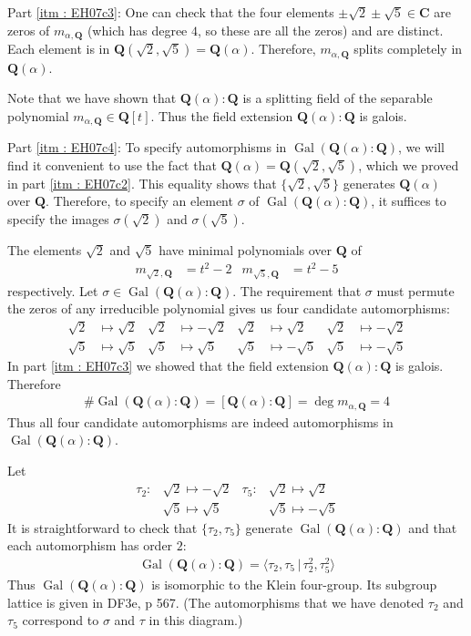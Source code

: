 \documentclass[oneside, english, 11pt]{article}
\newcommand{\fontField}[1]{\mathbf{#1}}
\newcommand{\C}{\complexes}
\newcommand{\complexes}{\fontField{C}}
\newcommand{\Gal}{\galoisGroup}
\DeclareMathOperator{\galoisGroup}{Gal}
\newcommand{\order}{\#}
\newcommand{\Q}{\rationals}
\newcommand{\rationals}{\fontField{Q}}
\newcommand{\st}{{\, | \,}}
\begin{document}
Part \ref{itm : EH07c3}: One can check that the four elements $\pm{}\sqrt{2} \pm{} \sqrt{5} \in \C$ are zeros of $m_{\alpha, \Q}$ (which has degree $4$, so these are all the zeros) and are distinct. Each element is in $\Q(\sqrt{2}, \sqrt{5}) = \Q(\alpha)$. Therefore, $m_{\alpha, \Q}$ splits completely in $\Q(\alpha)$.

Note that we have shown that $\Q(\alpha) : \Q$ is a splitting field of the separable polynomial $m_{\alpha, \Q} \in \Q[t]$. Thus the field extension $\Q(\alpha) : \Q$ is galois.

Part \ref{itm : EH07c4}: To specify automorphisms in $\Gal(\Q(\alpha) : \Q)$, we will find it convenient to use the fact that $\Q(\alpha) = \Q(\sqrt{2}, \sqrt{5})$, which we proved in part \ref{itm : EH07c2}. This equality shows that $\{\sqrt{2}, \sqrt{5}\}$ generates $\Q(\alpha)$ over $\Q$. Therefore, to specify an element $\sigma$ of $\Gal(\Q(\alpha) : \Q)$, it suffices to specify the images $\sigma(\sqrt{2})$ and $\sigma(\sqrt{5})$.

The elements $\sqrt{2}$ and $\sqrt{5}$ have minimal polynomials over $\Q$ of
\begin{align*}
m_{\sqrt{2}, \Q}
&=
t^{2} - 2
&
m_{\sqrt{5}, \Q}
&=
t^{2} - 5
\end{align*}
respectively. Let $\sigma \in \Gal(\Q(\alpha) : \Q)$. The requirement that $\sigma$ must permute the zeros of any irreducible polynomial gives us four candidate automorphisms:
\begin{align*}
\sqrt{2}
&\mapsto
\sqrt{2}
&
\sqrt{2}
&\mapsto
-\sqrt{2}
&
\sqrt{2}
&\mapsto
\sqrt{2}
&
\sqrt{2}
&\mapsto
-\sqrt{2}
\\
\sqrt{5}
&\mapsto
\sqrt{5}
&
\sqrt{5}
&\mapsto
\sqrt{5}
&
\sqrt{5}
&\mapsto
-\sqrt{5}
&
\sqrt{5}
&\mapsto
-\sqrt{5}
\end{align*}
In part \ref{itm : EH07c3} we showed that the field extension $\Q(\alpha) : \Q$ is galois. Therefore
\begin{align*}
\order \Gal(\Q(\alpha) : \Q)
=
[\Q(\alpha) : \Q]
=
\deg m_{\alpha, \Q}
=
4
\end{align*}
Thus all four candidate automorphisms are indeed automorphisms in $\Gal(\Q(\alpha) : \Q)$.

Let
\begin{align*}
\tau_{2}
:
{}&\sqrt{2}
\mapsto
-\sqrt{2}
&
\tau_{5}
:
{}&\sqrt{2}
\mapsto
\sqrt{2}
\\
&\sqrt{5}
\mapsto
\sqrt{5}
&
&\sqrt{5}
\mapsto
-\sqrt{5}
\end{align*}
It is straightforward to check that $\{\tau_{2}, \tau_{5}\}$ generate $\Gal(\Q(\alpha) : \Q)$ and that each automorphism has order $2$:
\begin{align*}
\Gal(\Q(\alpha) : \Q)
=
\langle{}\tau_{2}, \tau_{5} \st \tau_{2}^{2}, \tau_{5}^{2}\rangle{}
\end{align*}
Thus $\Gal(\Q(\alpha) : \Q)$ is isomorphic to the Klein four-group. Its subgroup lattice is given in DF3e, p 567. (The automorphisms that we have denoted $\tau_{2}$ and $\tau_{5}$ correspond to $\sigma$ and $\tau$ in this diagram.)
\end{document}
